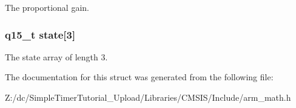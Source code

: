The proportional gain. \hypertarget{structarm__pid__instance__q15_a4c4e19d77015f5f7a31a1daf0faf31b6}{
\subsubsection[{state}]{\setlength{\rightskip}{0pt plus 5cm}q15\-\_\-t state\mbox{[}3\mbox{]}}}\label{structarm__pid__instance__q15_a4c4e19d77015f5f7a31a1daf0faf31b6}
The state array of length 3. 

The documentation for this struct was generated from the following file\-:\begin{DoxyCompactItemize}
\item 
Z\-:/dc/\-Simple\-Timer\-Tutorial\-\_\-\-Upload/\-Libraries/\-C\-M\-S\-I\-S/\-Include/arm\-\_\-math.\-h\end{DoxyCompactItemize}
